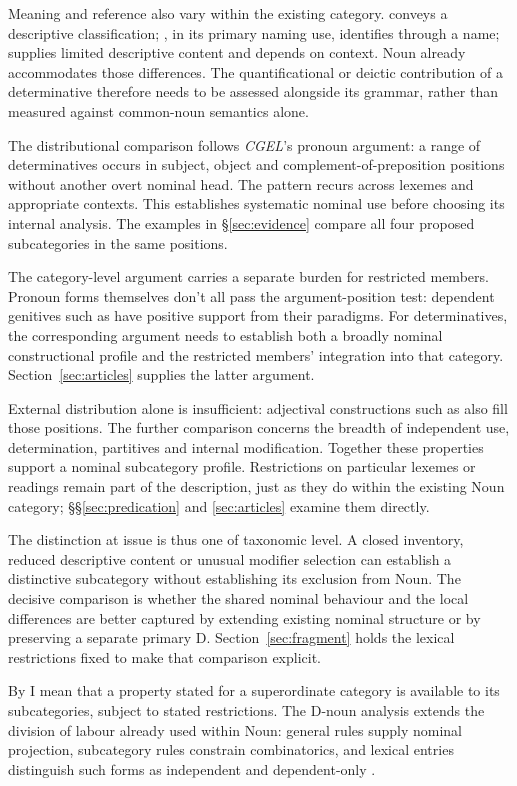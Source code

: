 \documentclass[12pt]{article}
\begin{document}
Meaning and reference also vary within the existing category.  conveys a descriptive classification; , in its primary naming use, identifies through a name;  supplies limited descriptive content and depends on context. Noun already accommodates those differences. The quantificational or deictic contribution of a determinative therefore needs to be assessed alongside its grammar, rather than measured against common-noun semantics alone.

The distributional comparison follows \textit{CGEL}'s pronoun argument: a range of determinatives occurs in subject, object and complement-of-preposition positions without another overt nominal head. The pattern recurs across lexemes and appropriate contexts. This establishes systematic nominal use before choosing its internal analysis. The examples in §\ref{sec:evidence} compare all four proposed subcategories in the same positions.

The category-level argument carries a separate burden for restricted members. Pronoun forms themselves don't all pass the argument-position test: dependent genitives such as  have positive support from their paradigms. For determinatives, the corresponding argument needs to establish both a broadly nominal constructional profile and the restricted members' integration into that category. Section~\ref{sec:articles} supplies the latter argument.

External distribution alone is insufficient: adjectival constructions such as  also fill those positions. The further comparison concerns the breadth of independent use, determination, partitives and internal modification. Together these properties support a nominal subcategory profile. Restrictions on particular lexemes or readings remain part of the description, just as they do within the existing Noun category; §§\ref{sec:predication} and \ref{sec:articles} examine them directly.

The distinction at issue is thus one of taxonomic level. A closed inventory, reduced descriptive content or unusual modifier selection can establish a distinctive subcategory without establishing its exclusion from Noun. The decisive comparison is whether the shared nominal behaviour and the local differences are better captured by extending existing nominal structure or by preserving a separate primary D. Section~\ref{sec:fragment} holds the lexical restrictions fixed to make that comparison explicit.

By  I mean that a property stated for a superordinate category is available to its subcategories, subject to stated restrictions. The D-noun analysis extends the division of labour already used within Noun: general rules supply nominal projection, subcategory rules constrain combinatorics, and lexical entries distinguish such forms as independent  and dependent-only .
\end{document}
